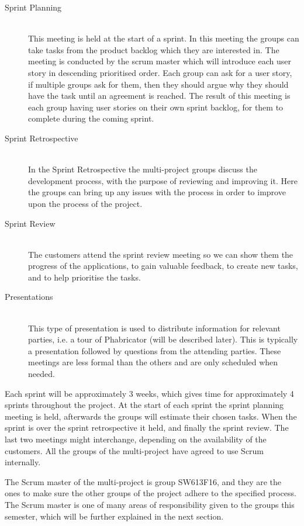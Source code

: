 \begin{description}
	\item[Sprint Planning] \hfill \\
	This meeting is held at the start of a sprint. 
	In this meeting the groups can take tasks from the product backlog which they are interested in. 
	The meeting is conducted by the scrum master which will introduce each user story in descending prioritised order. 
	Each group can ask for a user story, if multiple groups ask for them, then they should argue why they should have the task until an agreement is reached. 
	The result of this meeting is each group having user stories on their own sprint backlog, for them to complete during the coming sprint. 
	\item[Sprint Retrospective] \hfill \\
	In the Sprint Retrospective the multi-project groups discuss the development process, with the purpose of reviewing and improving it. 
	Here the groups can bring up any issues with the process in order to improve upon the process of the project.
	\item[Sprint Review] \hfill \\
	The customers attend the sprint review meeting so we can show them the progress of the applications, to gain valuable feedback, to create new tasks, and to help prioritise the tasks. 
	\item[Presentations] \hfill \\
	This type of presentation is used to distribute information for relevant parties, i.e. a tour of Phabricator (will be described later). 
	This is typically a presentation followed by questions from the attending parties. 
	These meetings are less formal than the others and are only scheduled when needed.
\end{description}

Each sprint will be approximately 3 weeks, which gives time for approximately 4 sprints throughout the project.
At the start of each sprint the sprint planning meeting is held, afterwards the groups will estimate their chosen tasks.
When the sprint is over the sprint retrospective it held, and finally the sprint review.
The last two meetings might interchange, depending on the availability of the customers.
All the groups of the multi-project have agreed to use Scrum internally.

The Scrum master of the multi-project is group SW613F16, and they are the ones to make sure the other groups of the project adhere to the specified process.
The Scrum master is one of many areas of responsibility given to the groups this semester, which will be further explained in the next section.


